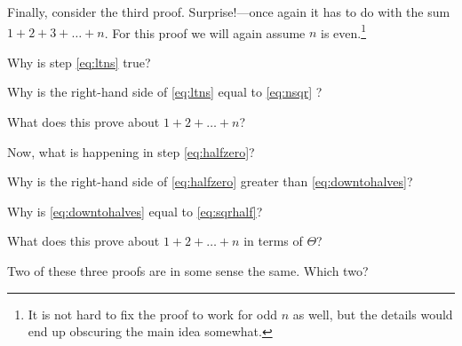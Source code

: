 \documentclass{tufte-handout}
\begin{document}
Finally, consider the third proof.  Surprise!---once again it has to
do with the sum $1 + 2 + 3 + \dots + n$.  For this proof we will
again assume $n$ is even.\footnote{It is not hard to fix the proof to work
  for odd $n$ as well, but the details would end up obscuring the main
  idea somewhat.}
\begin{questions}
  \item Why is step \eqref{eq:ltns} true?
  \item Why is the right-hand side of \eqref{eq:ltns} equal to
    \eqref{eq:nsqr} ?
  \item What does this prove about $1 + 2 + \dots + n$?
  \item Now, what is happening in step \eqref{eq:halfzero}?
  \item Why is the right-hand side of \eqref{eq:halfzero} greater than
    \eqref{eq:downtohalves}?
  \item Why is \eqref{eq:downtohalves} equal to \eqref{eq:sqrhalf}?
  \item What does this prove about $1 + 2 + \dots + n$ in terms of $\Theta$?
  \item Two of these three proofs are in some sense the same.  Which two?
  \end{questions}
\end{document}
